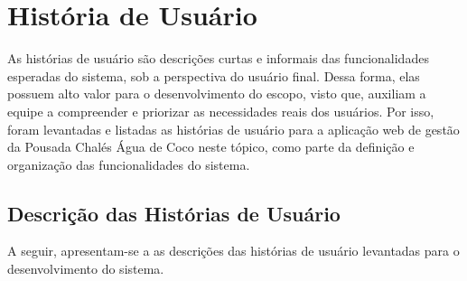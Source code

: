 \documentclass[
	12pt,				%
	openany,			%
	twoside,			%
	a4paper,			%
	english,			%
	french,				%
	spanish,			%
	brazil				%
	]{abntex2}
\begin{document}
\section{História de Usuário}
As histórias de usuário são descrições curtas e informais das funcionalidades esperadas do sistema, sob a perspectiva do usuário final. Dessa forma, elas possuem alto valor para o desenvolvimento do escopo, visto que, auxiliam a equipe a compreender e priorizar as necessidades reais dos usuários. Por isso, foram levantadas e listadas as histórias de usuário para a aplicação web de gestão da Pousada Chalés Água de Coco neste tópico, como parte da definição e organização das funcionalidades do sistema.
\subsection{Descrição das Histórias de Usuário}
A seguir, apresentam-se a as descrições das histórias de usuário levantadas para o desenvolvimento do sistema.
\end{document}
